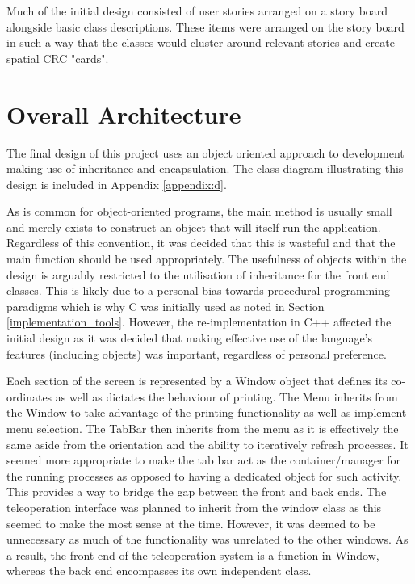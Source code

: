 Much of the initial design consisted of user stories arranged on a story board alongside basic class descriptions. These items were arranged on the story board in such a way that the classes would cluster around relevant stories and create spatial CRC "cards".

\section{Overall Architecture}

The final design of this project uses an object oriented approach to development making use of inheritance and encapsulation. The class diagram illustrating this design is included in Appendix \ref{appendix:d}.

As is common for object-oriented programs, the main method is usually small and merely exists to construct an object that will itself run the application. Regardless of this convention, it was decided that this is wasteful and that the main function should be used appropriately. The usefulness of objects within the design is arguably restricted to the utilisation of inheritance for the front end classes. This is likely due to a personal bias towards procedural programming paradigms which is why {\selectfont C} was initially used as noted in Section \ref{implementation_tools}. However, the re-implementation in {\selectfont C++} affected the initial design as it was decided that making effective use of the language's features (including objects) was important, regardless of personal preference.

Each section of the screen is represented by a Window object that defines its co-ordinates as well as dictates the behaviour of printing. The Menu inherits from the Window to take advantage of the printing functionality as well as implement menu selection. The TabBar then inherits from the menu as it is effectively the same aside from the orientation and the ability to iteratively refresh processes. It seemed more appropriate to make the tab bar act as the container/manager for the running processes as opposed to having a dedicated object for such activity. This provides a way to bridge the gap between the front and back ends. The teleoperation interface was planned to inherit from the window class as this seemed to make the most sense at the time. However, it was deemed to be unnecessary as much of the functionality was unrelated to the other windows. As a result, the front end of the teleoperation system is a function in Window, whereas the back end encompasses its own independent class.

